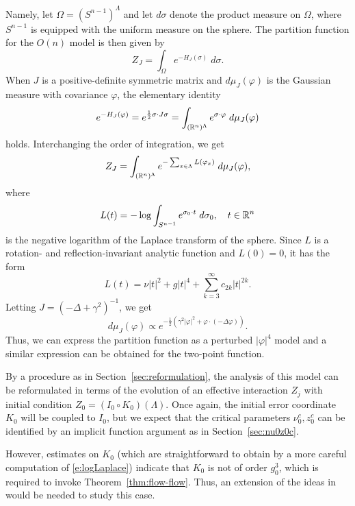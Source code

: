 Namely, let $\Omega = (S^{n-1})^\Lambda$ and let $d\sigma$ denote the product measure on $\Omega$,
where $S^{n-1}$ is equipped with the uniform measure on the sphere. The partition function
for the $O(n)$ model is then given by
\begin{equation}
Z_J = \int_\Omega e^{-H_J(\sigma)} \; d\sigma.
\end{equation}
When $J$ is a positive-definite symmetric
matrix and $d\mu_J(\varphi)$ is the Gaussian measure with covariance $\varphi$, the elementary
identity
\begin{equation}
e^{-H_J(\varphi)}
	=
e^{\frac12 \sigma \cdot J \sigma}
	=
\int_{({\mathbb R}^n)^\Lambda} e^{\sigma \cdot \varphi} \; d\mu_J(\varphi)
\end{equation}
holds. Interchanging the order of integration, we get
\begin{equation}
Z_J
	=
\int_{({\mathbb R}^n)^\Lambda}
e^{-\sum_{x\in\Lambda} L(\varphi_x)}
\; d\mu_J(\varphi),
\end{equation}
where
\begin{equation}
L(t)
	=
-\log
\int_{S^{n-1}} e^{\sigma_0 \cdot t} \; d\sigma_0,
	\quad
t\in{\mathbb R}^n
\end{equation}
is the negative logarithm of the Laplace transform of the sphere. Since $L$ is
a rotation- and reflection-invariant analytic function and $L(0) = 0$, it has
the form
\begin{equation}
\label{e:logLaplace}
L(t) = \nu |t|^2 + g |t|^4 + \sum_{k=3}^\infty c_{2k} |t|^{2k}.
\end{equation}
Letting $J = (-\Delta + \gamma^2)^{-1}$, we get
\begin{equation}
d\mu_J(\varphi)
	\propto
e^{-\frac12 (\gamma^2 |\varphi|^2 + \varphi \cdot (-\Delta \varphi))}.
\end{equation}
Thus, we can express the partition function as a perturbed $|\varphi|^4$ model
and a similar expression can be obtained for the two-point function.

By a procedure as in Section~\ref{sec:reformulation}, the analysis of this model
can be reformulated in terms of the evolution of an effective interaction $Z_j$
with initial condition $Z_0 = (I_0 \circ K_0)(\Lambda)$. Once again, the initial
error coordinate $K_0$ will be coupled to $I_0$, but we expect that the critical
parameters $\nu_0^c, z_0^c$ can be identified by an implicit function argument
as in Section~\ref{sec:nu0z0c}.

However, estimates on $K_0$ (which are straightforward
to obtain by a more careful computation of \eqref{e:logLaplace}) indicate that
$K_0$ is not of order $g_0^3$, which is required to invoke Theorem~\ref{thm:flow-flow}.
Thus, an extension of the ideas in \cite{BBS-rg-flow} would be needed to study this
case.

